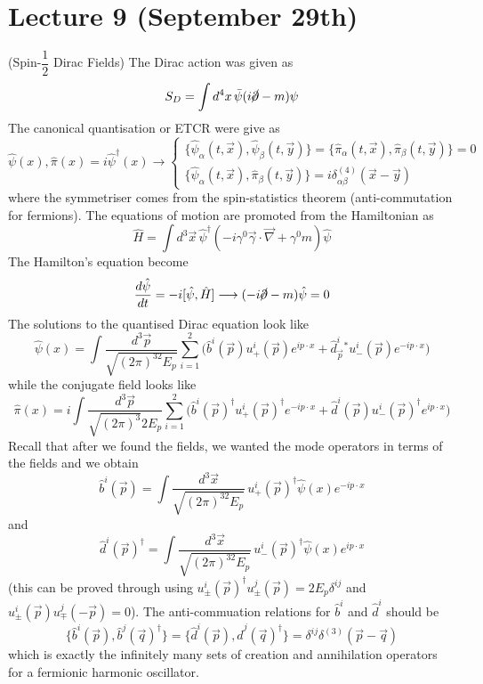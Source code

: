 \section{Lecture 9 (September 29th)}
\begin{defi}
(Spin-$\dfrac{1}{2}$ Dirac Fields) The Dirac action was given as
\[S_{D}=\int d^{4}x\,\bar{\psi }(i\cancel{\partial }-m)\psi \]
The canonical quantisation or ETCR were give as
\[\hat{\psi }(x),\hat{\pi }(x)=i\hat{\psi }^{\dagger}(x)\longrightarrow 
\begin{cases}
\{\hat{\psi }_{\alpha }(t,\vec{x}),\hat{\psi }_{\beta }(t,\vec{y})\}=\{\hat{\pi }_{\alpha }(t,\vec{x}),\hat{\pi }_{\beta }(t,\vec{y})\}=0\\
\{\hat{\psi }_{\alpha }(t,\vec{x}),\hat{\pi }_{\beta }(t,\vec{y})\}=i\delta _{\alpha \beta }^{(4)}(\vec{x}-\vec{y})
\end{cases}\]
where the symmetriser comes from the spin-statistics theorem (anti-commutation for fermions). The equations of motion are promoted from the Hamiltonian as
\[\hat{H}=\int d^3\vec{x}\,\hat{\psi }^{\dagger}(-i\gamma^{0}\vec{\gamma }\cdot \vec{\nabla }+\gamma ^{0}m)\hat{\psi }\]
The Hamilton's equation become 
\[\dfrac{d \hat{\psi }}{d t}=-i[\hat{\psi },\hat{H}]\longrightarrow (-i\cancel{\partial }-m)\hat{\psi }=0\]
The solutions to the quantised Dirac equation look like
\[\hat{\psi } (x)=\int \dfrac{d^3\vec{p}}{\sqrt{(2\pi )^32E_{p}}}\sum ^{2}_{i=1}\Big(\hat{b}^{i}(\vec{p})u^{i}_{+}(\vec{p})e^{ip\cdot x}+\hat{d}^{i}_{\vec{p}}^{*}u_{-}^{i}(\vec{p})e^{-ip\cdot x}\Big)\]
while the conjugate field looks like 
\[\hat{\pi }(x)=i\int \dfrac{d^3\vec{p}}{\sqrt{(2\pi )^3}2E_{p}}\sum ^{2}_{i=1}\Big(\hat{b}^{i}(\vec{p})^{\dagger}u_{+}^{i}(\vec{p})^{\dagger}e^{-ip\cdot x}+\hat{d}^{i}(\vec{p})u^{i}_{-}(\vec{p})^{\dagger}e^{ip\cdot x}\Big)\]
Recall that after we found the fields, we wanted the mode operators in terms of the fields and we obtain
\[\hat{b}^{i}(\vec{p})=\int \dfrac{d^3\vec{x}}{\sqrt{(2\pi )^32E_{p}}}\,u^{i}_{+}(\vec{p})^{\dagger}\hat{\psi }(x)e^{-ip\cdot x}\]
and
\[\hat{d}^{i}(\vec{p})^{\dagger}=\int \dfrac{d^3\vec{x}}{\sqrt{(2\pi )^32E_{p}}}\,u_{-}^{i}(\vec{p})^{\dagger}\hat{\psi }(x)e^{ip\cdot x}\]
(this can be proved through using $u^{i}_{\pm}(\vec{p})^{\dagger}u^{j}_{\pm}(\vec{p})=2E_{p}\delta ^{ij}$ and $u_{\pm}^{i}(\vec{p})u^{j}_{\mp}(-\vec{p})=0$). The anti-commuation relations for $\hat{b}^{i}$ and $\hat{d}^{i}$ should be
\[\{\hat{b}^{i}(\vec{p}),\hat{b}^{j}(\vec{q})^{\dagger}\}=\{\hat{d}^{i}(\vec{p}),\hat{d}^{j}(\vec{q})^{\dagger}\}=\delta^{ij}\delta ^{(3)}(\vec{p}-\vec{q})\]
which is exactly the infinitely many sets of creation and annihilation operators for a fermionic harmonic oscillator.
\end{defi}
